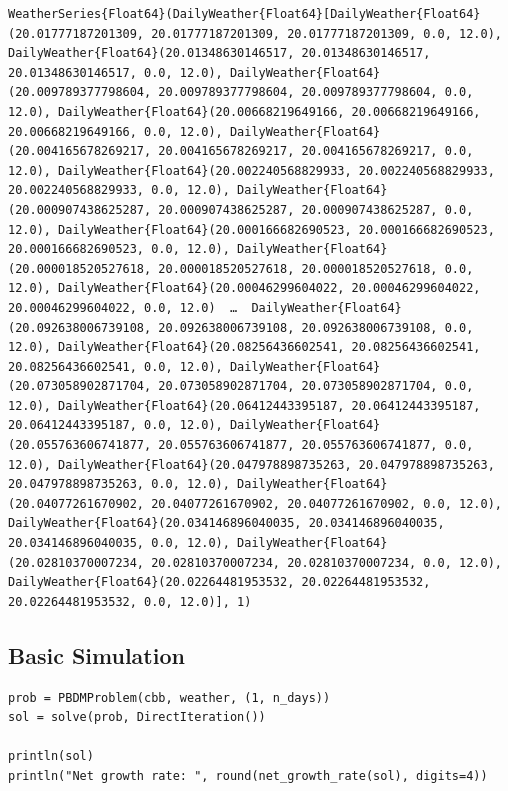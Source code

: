 \begin{verbatim}
WeatherSeries{Float64}(DailyWeather{Float64}[DailyWeather{Float64}(20.01777187201309, 20.01777187201309, 20.01777187201309, 0.0, 12.0), DailyWeather{Float64}(20.01348630146517, 20.01348630146517, 20.01348630146517, 0.0, 12.0), DailyWeather{Float64}(20.009789377798604, 20.009789377798604, 20.009789377798604, 0.0, 12.0), DailyWeather{Float64}(20.00668219649166, 20.00668219649166, 20.00668219649166, 0.0, 12.0), DailyWeather{Float64}(20.004165678269217, 20.004165678269217, 20.004165678269217, 0.0, 12.0), DailyWeather{Float64}(20.002240568829933, 20.002240568829933, 20.002240568829933, 0.0, 12.0), DailyWeather{Float64}(20.000907438625287, 20.000907438625287, 20.000907438625287, 0.0, 12.0), DailyWeather{Float64}(20.000166682690523, 20.000166682690523, 20.000166682690523, 0.0, 12.0), DailyWeather{Float64}(20.000018520527618, 20.000018520527618, 20.000018520527618, 0.0, 12.0), DailyWeather{Float64}(20.00046299604022, 20.00046299604022, 20.00046299604022, 0.0, 12.0)  …  DailyWeather{Float64}(20.092638006739108, 20.092638006739108, 20.092638006739108, 0.0, 12.0), DailyWeather{Float64}(20.08256436602541, 20.08256436602541, 20.08256436602541, 0.0, 12.0), DailyWeather{Float64}(20.073058902871704, 20.073058902871704, 20.073058902871704, 0.0, 12.0), DailyWeather{Float64}(20.06412443395187, 20.06412443395187, 20.06412443395187, 0.0, 12.0), DailyWeather{Float64}(20.055763606741877, 20.055763606741877, 20.055763606741877, 0.0, 12.0), DailyWeather{Float64}(20.047978898735263, 20.047978898735263, 20.047978898735263, 0.0, 12.0), DailyWeather{Float64}(20.04077261670902, 20.04077261670902, 20.04077261670902, 0.0, 12.0), DailyWeather{Float64}(20.034146896040035, 20.034146896040035, 20.034146896040035, 0.0, 12.0), DailyWeather{Float64}(20.02810370007234, 20.02810370007234, 20.02810370007234, 0.0, 12.0), DailyWeather{Float64}(20.02264481953532, 20.02264481953532, 20.02264481953532, 0.0, 12.0)], 1)
\end{verbatim}



\subsection{Basic Simulation}



\label{13985587334995857634}{}



\begin{verbatim}
prob = PBDMProblem(cbb, weather, (1, n_days))
sol = solve(prob, DirectIteration())

println(sol)
println("Net growth rate: ", round(net_growth_rate(sol), digits=4))
\end{verbatim}




